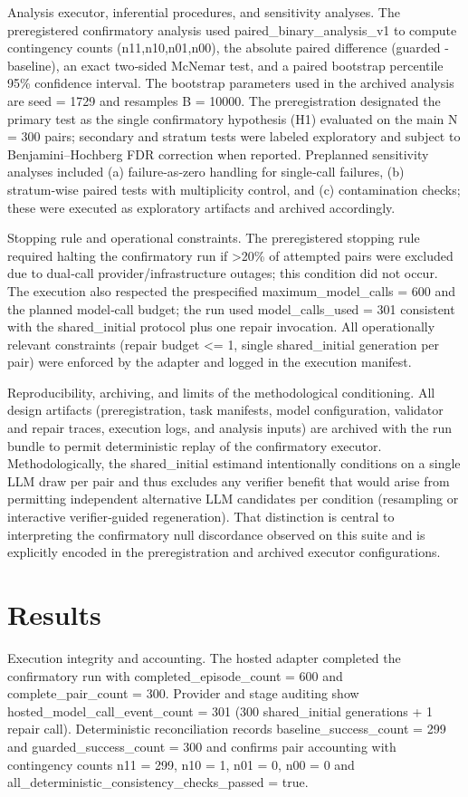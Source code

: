 \documentclass[conference]{IEEEtran}
\begin{document}
Analysis executor, inferential procedures, and sensitivity analyses. The preregistered confirmatory analysis used paired\_binary\_analysis\_v1 to compute contingency counts (n11,n10,n01,n00), the absolute paired difference (guarded - baseline), an exact two‑sided McNemar test, and a paired bootstrap percentile 95\% confidence interval. The bootstrap parameters used in the archived analysis are seed = 1729 and resamples B = 10000. The preregistration designated the primary test as the single confirmatory hypothesis (H1) evaluated on the main N = 300 pairs; secondary and stratum tests were labeled exploratory and subject to Benjamini--Hochberg FDR correction when reported. Preplanned sensitivity analyses included (a) failure‑as‑zero handling for single‑call failures, (b) stratum‑wise paired tests with multiplicity control, and (c) contamination checks; these were executed as exploratory artifacts and archived accordingly.

Stopping rule and operational constraints. The preregistered stopping rule required halting the confirmatory run if >20\% of attempted pairs were excluded due to dual‑call provider/infrastructure outages; this condition did not occur. The execution also respected the prespecified maximum\_model\_calls = 600 and the planned model‑call budget; the run used model\_calls\_used = 301 consistent with the shared\_initial protocol plus one repair invocation. All operationally relevant constraints (repair budget <= 1, single shared\_initial generation per pair) were enforced by the adapter and logged in the execution manifest.

Reproducibility, archiving, and limits of the methodological conditioning. All design artifacts (preregistration, task manifests, model configuration, validator and repair traces, execution logs, and analysis inputs) are archived with the run bundle to permit deterministic replay of the confirmatory executor. Methodologically, the shared\_initial estimand intentionally conditions on a single LLM draw per pair and thus excludes any verifier benefit that would arise from permitting independent alternative LLM candidates per condition (resampling or interactive verifier‑guided regeneration). That distinction is central to interpreting the confirmatory null discordance observed on this suite and is explicitly encoded in the preregistration and archived executor configurations.

\section{Results}
Execution integrity and accounting. The hosted adapter completed the confirmatory run with completed\_episode\_count = 600 and complete\_pair\_count = 300. Provider and stage auditing show hosted\_model\_call\_event\_count = 301 (300 shared\_initial generations + 1 repair call). Deterministic reconciliation records baseline\_success\_count = 299 and guarded\_success\_count = 300 and confirms pair accounting with contingency counts n11 = 299, n10 = 1, n01 = 0, n00 = 0 and all\_deterministic\_consistency\_checks\_passed = true.
\end{document}
